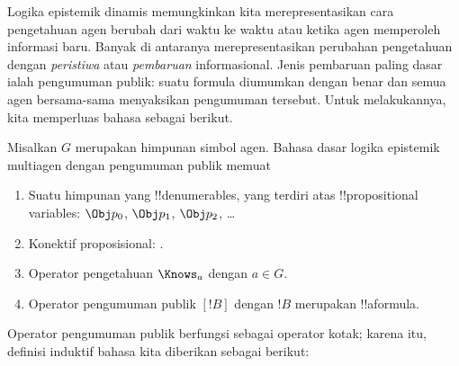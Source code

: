 \documentclass[../../../include/open-logic-section]{subfiles}
\begin{document}


Logika epistemik dinamis memungkinkan kita merepresentasikan cara pengetahuan
agen berubah dari waktu ke waktu atau ketika agen memperoleh informasi baru.
Banyak di antaranya merepresentasikan perubahan pengetahuan dengan
\emph{peristiwa} atau \emph{pembaruan} informasional. Jenis pembaruan paling
dasar ialah pengumuman publik: suatu formula diumumkan dengan benar dan semua
agen bersama-sama menyaksikan pengumuman tersebut. Untuk melakukannya, kita
memperluas bahasa sebagai berikut.

\begin{defn}
Misalkan $G$ merupakan himpunan simbol agen. Bahasa dasar logika epistemik
multiagen dengan pengumuman publik memuat
\begin{enumerate}
  \item Suatu himpunan yang !!{denumerable}s, yang terdiri atas
    !!{propositional variable}s: $\Obj p_0$, $\Obj p_1$, $\Obj p_2$, \dots
  \item Konektif proposisional: \startycommalist
  .
  \item Operator pengetahuan $\Knows_a$ dengan $a\in G$.
  \item Operator pengumuman publik $[!B]$ dengan $!B$ merupakan !!a{formula}.
\end{enumerate}
\end{defn}

Operator pengumuman publik berfungsi sebagai operator kotak; karena itu,
definisi induktif bahasa kita diberikan sebagai berikut:
\end{document}
